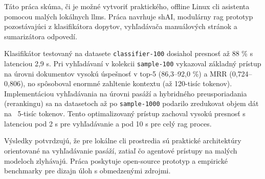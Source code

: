 Táto práca skúma, či je možné vytvoriť praktického, offline Linux \gls{cli}
asistenta pomocou malých lokálnych \glspl{llm}. Práca navrhuje shAI, modulárny
\gls{rag} prototyp pozostávajúci z klasifikátora dopytov, vyhľadávača
manuálových stránok a sumarizátora odpovedí.

Klasifikátor testovaný na datasete \texttt{classifier-100} dosiahol presnosť až
88 \% s latenciou 2,9 s. Pri vyhľadávaní v kolekcii \texttt{sample-100}
vykazoval základný prístup na úrovni dokumentov vysokú úspešnosť v top-5
(86,3--92,0 \%) a MRR (0,724--0,806), no spôsoboval enormné zahltenie kontextu
(až 120-tisíc tokenov). Implementáciou vyhľadávania na úrovni pasáží a
hybridného preusporiadania (rerankingu) sa na datasetoch až po
\texttt{sample-1000} podarilo zredukovat objem dát na ~5-tisíc tokenov. Tento
optimalizovaný prístup zachoval vysokú presnosť s latenciou pod 2 s pre
vyhľadávanie a pod 10 s pre celý \gls{rag} proces.

Výsledky potvrdzujú, že pre lokálne \gls{cli} prostredia sú praktické
architektúry orientované na vyhľadávanie pasáží, zatiaľ čo agentové prístupy na
malých modeloch zlyhávajú. Práca poskytuje open-source prototyp a empirické
benchmarky pre dizajn úloh s obmedzenými zdrojmi.
